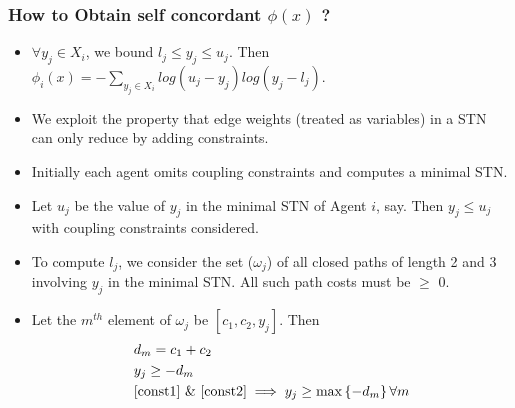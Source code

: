 \documentclass{beamer}
\newcommand\FontviTen{\fontsize{10}{7.2}\selectfont}
\begin{document}
\begin{frame}
\frametitle{ How to Obtain self concordant $\phi(x)$ ? }
\FontviTen 
\begin{itemize}
\item $\forall y_j \in X_i$, we bound $l_j \leq y_j \leq u_j$. Then $\phi_i(x) = -\sum_{y_j \in X_i} log(u_j - y_j)log(y_j - l_j)$. 
\item We exploit the property that edge weights (treated as variables) in a STN can only reduce by adding constraints.
\item Initially each agent omits coupling constraints and computes a minimal STN.
\item Let $u_j$ be the value of $y_j$ in the minimal STN of Agent $i$, say. Then $y_j \leq u_j$ with coupling constraints considered.
\item To compute $l_j$, we consider the set ($\omega_j$) of all closed paths of length 2 and 3 involving $y_j$ in the minimal STN. All such path costs must be $\geq$ 0. 
\item Let the $m^{th}$ element of $\omega_j$ be $\left[c_{1} , c_{2} , y_j\right]$. Then 
\begin{eqnarray}
\label{triangleconstraint}
\label{const1}
&d_m = c_1 + c_2 \\
\label{const2}
&y_j \geq -d_m \\
&\ref{const1} \text{ \& } \ref{const2} \implies y_j \geq \mathrm{max} \left\lbrace -d_m \right\rbrace \forall m \nonumber
\end{eqnarray}
\end{itemize}
\end{frame}

\end{document}
